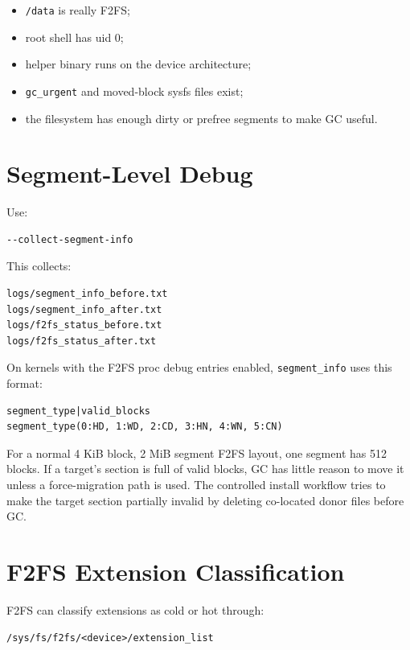 \documentclass[11pt]{article}
\begin{document}
\begin{itemize}[nosep]
\item \texttt{/data} is really F2FS;
\item root shell has uid 0;
\item helper binary runs on the device architecture;
\item \texttt{gc\_urgent} and moved-block sysfs files exist;
\item the filesystem has enough dirty or prefree segments to make GC useful.
\end{itemize}

\section{Segment-Level Debug}

Use:

\begin{verbatim}
--collect-segment-info
\end{verbatim}

This collects:

\begin{verbatim}
logs/segment_info_before.txt
logs/segment_info_after.txt
logs/f2fs_status_before.txt
logs/f2fs_status_after.txt
\end{verbatim}

On kernels with the F2FS proc debug entries enabled, \texttt{segment\_info}
uses this format:

\begin{verbatim}
segment_type|valid_blocks
segment_type(0:HD, 1:WD, 2:CD, 3:HN, 4:WN, 5:CN)
\end{verbatim}

For a normal 4 KiB block, 2 MiB segment F2FS layout, one segment has 512
blocks.  If a target's section is full of valid blocks, GC has little reason to
move it unless a force-migration path is used.  The controlled install workflow
tries to make the target section partially invalid by deleting co-located donor
files before GC.

\section{F2FS Extension Classification}

F2FS can classify extensions as cold or hot through:

\begin{verbatim}
/sys/fs/f2fs/<device>/extension_list
\end{verbatim}
\end{document}
